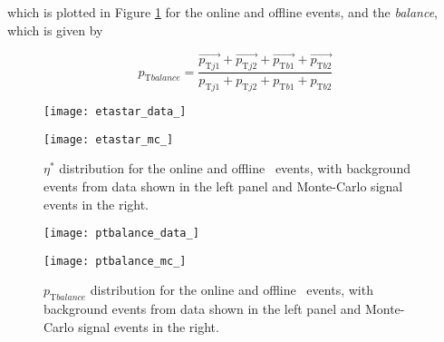 	which is plotted in Figure \ref{f:etastar} for the online and offline events, and the \pt \textit{balance}, which is given by

	\begin{equation}
		p_{\text{T} balance} = \frac{\vec{p_{\text{T}j1}} + \vec{p_{\text{T}j2}} + \vec{p_{\text{T}b1}} + \vec{p_{\text{T}b2}}}{p_{\text{T}j1} + p_{\text{T}j2} + p_{\text{T}b1} + p_{\text{T}b2}}
	\end{equation}

	\begin{figure}[h]
		\centering
		\begin{minipage}[h]{0.48\linewidth}
			\texttt{[image: etastar\_data\_]}
		\end{minipage}
		\quad
		\begin{minipage}[h]{0.48\linewidth}
			\texttt{[image: etastar\_mc\_]}
		\end{minipage}
		\label{f:etastar}
		\caption[Comparison of the $\eta^*$ distribution of the \VBFHBB\ events for HLT and offline objects]{$\eta^*$ distribution for the online and offline \VBFHBB\ events, with background events from data shown in the left panel and Monte-Carlo signal events in the right.}
	\end{figure}

	\begin{figure}[h]
		\centering
		\begin{minipage}[h]{0.48\linewidth}
			\texttt{[image: ptbalance\_data\_]}
		\end{minipage}
		\quad
		\begin{minipage}[h]{0.48\linewidth}
			\texttt{[image: ptbalance\_mc\_]}
		\end{minipage}
		\label{f:ptbalance}
		\caption[Comparison of the $p_{\text{T} balance}$ distribution of the \VBFHBB\ events for HLT and offline objects]{$p_{\text{T} balance}$ distribution for the online and offline \VBFHBB\ events, with background events from data shown in the left panel and Monte-Carlo signal events in the right.}
	\end{figure}

\endinput
